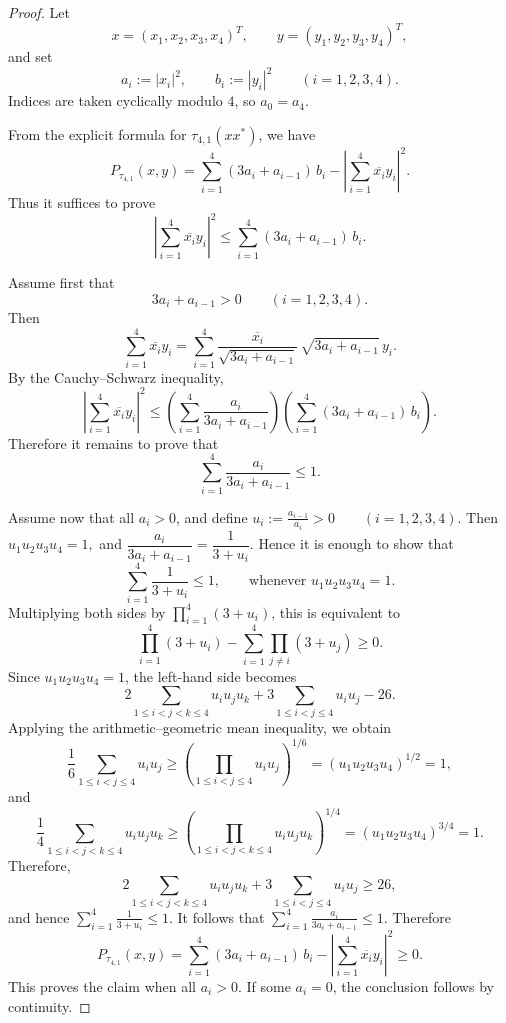 \documentclass[10pt,a4paper]{amsart}
\begin{document}
\begin{proof}
Let
\[
x=(x_1,x_2,x_3,x_4)^T,\qquad y=(y_1,y_2,y_3,y_4)^T,
\]
and set
\[
a_i:=|x_i|^2,\qquad b_i:=|y_i|^2
\qquad (i=1,2,3,4).
\]
Indices are taken cyclically modulo $4$, so $a_0=a_4$.

From the explicit formula for $\tau_{4,1}(xx^*)$, we have
\[
P_{\tau_{4,1}}(x,y)
=
\sum_{i=1}^4 (3a_i+a_{i-1})\,b_i
-\left|\sum_{i=1}^4 \overline{x_i}y_i\right|^2.
\]
Thus it suffices to prove
\[
\left|\sum_{i=1}^4 \overline{x_i}y_i\right|^2
\le
\sum_{i=1}^4 (3a_i+a_{i-1})\,b_i.
\]

Assume first that
\[
3a_i+a_{i-1}>0
\qquad (i=1,2,3,4).
\]
Then
\[
\sum_{i=1}^4 \overline{x_i}y_i
=
\sum_{i=1}^4
\frac{\overline{x_i}}{\sqrt{3a_i+a_{i-1}}}\,
\sqrt{3a_i+a_{i-1}}\,y_i.
\]
By the Cauchy--Schwarz inequality,
\[
\left|\sum_{i=1}^4 \overline{x_i}y_i\right|^2
\le
\left(\sum_{i=1}^4 \frac{a_i}{3a_i+a_{i-1}}\right)
\left(\sum_{i=1}^4 (3a_i+a_{i-1})\,b_i\right).
\]
Therefore it remains to prove that
\[
\sum_{i=1}^4 \frac{a_i}{3a_i+a_{i-1}}\le 1.
\]

Assume now that all $a_i>0$, and define
\(\displaystyle
u_i:=\frac{a_{i-1}}{a_i}>0
\qquad (i=1,2,3,4).
\)
Then
\(
u_1u_2u_3u_4=1,
\)
and
\(
\dfrac{a_i}{3a_i+a_{i-1}}=\dfrac{1}{3+u_i}.
\)
Hence it is enough to show that
\[
\sum_{i=1}^4 \frac{1}{3+u_i}\le 1,
\qquad\text{whenever }u_1u_2u_3u_4=1.
\]
Multiplying both sides by $\prod_{i=1}^4(3+u_i)$, this is equivalent to
\[
\prod_{i=1}^4(3+u_i)-\sum_{i=1}^4 \prod_{j\ne i}(3+u_j)\ge 0.
\]
Since $u_1u_2u_3u_4=1$,  the left-hand side becomes
\[
2\sum_{1\le i<j<k\le 4}u_i u_j u_k
+3\sum_{1\le i<j\le 4}u_i u_j
-26.
\]
Applying the arithmetic--geometric mean inequality, we obtain 
\[
\frac{1}{6}\sum_{1\le i<j\le 4}u_i u_j
\ge
\left(\prod_{1\le i<j\le 4}u_i u_j\right)^{1/6}
=
(u_1u_2u_3u_4)^{1/2}=1,
\]
and 
\[
\frac{1}{4}\sum_{1\le i<j<k\le 4}u_i u_j u_k
\ge
\left(\prod_{1\le i<j<k\le 4}u_i u_j u_k\right)^{1/4}
=
(u_1u_2u_3u_4)^{3/4}=1.
\]
Therefore,
\[
2\sum_{1\le i<j<k\le 4}u_i u_j u_k
+3\sum_{1\le i<j\le 4}u_i u_j
\ge 26,
\]
and hence
\(\displaystyle
\sum_{i=1}^4 \frac{1}{3+u_i}\le 1.
\)
It follows that
\(\displaystyle
\sum_{i=1}^4 \frac{a_i}{3a_i+a_{i-1}}\le 1.
\)
Therefore
\[
P_{\tau_{4,1}}(x,y)
=
\sum_{i=1}^4 (3a_i+a_{i-1})\,b_i
-\left|\sum_{i=1}^4 \overline{x_i}y_i\right|^2
\ge 0.
\]
This proves the claim when all $a_i>0$. If some $a_i=0$, the conclusion follows by continuity. 
\end{proof}
\end{document}
